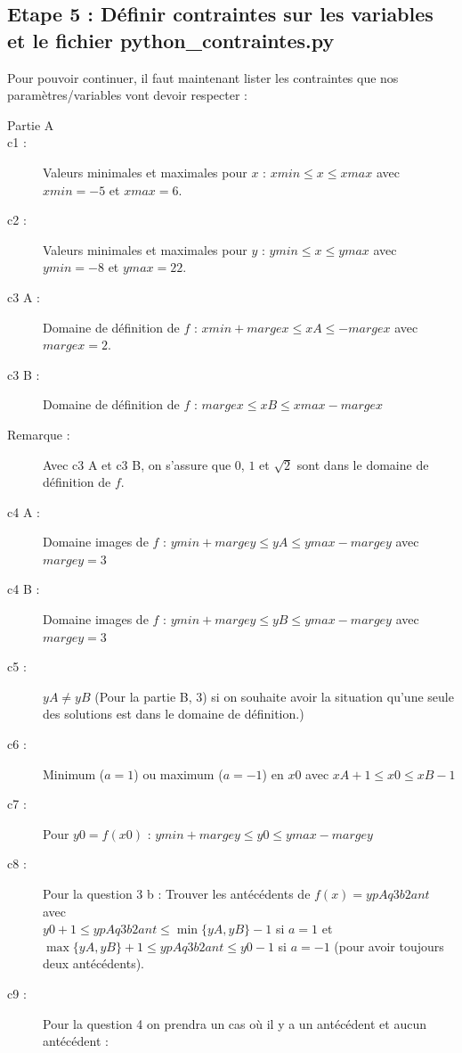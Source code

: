 {\begin{remarque}
\end{remarque}

\subsection{Etape 5 : Définir contraintes sur les variables et le fichier {\bf python\_contraintes.py}}
 Pour pouvoir continuer, il faut maintenant lister les contraintes que nos paramètres/variables vont devoir respecter : 

\begin{description}
\item[Partie A]
  \item[c1 : ] Valeurs minimales et maximales pour $x$ :  $xmin\leq x\leq xmax$ avec $xmin = -5$ et $xmax = 6$.
\item[c2 : ] Valeurs minimales et maximales pour $y$ :  $ymin\leq x\leq ymax$ avec $ymin = -8$ et $ymax = 22$.
\item[c3 A : ] Domaine de définition de $f$ : $xmin+margex\leq xA \leq -margex$ avec $margex = 2$. 
\item[c3 B : ] Domaine de définition de $f$ : $margex\leq xB \leq xmax-margex$ 
\item[Remarque : ] Avec c3 A et c3 B, on s'assure que $0$, $1$ et $\sqrt{2}$ sont dans le domaine de définition de $f$. 
\item[c4 A : ] Domaine images de $f$ : $ymin+margey\leq yA \leq ymax-margey$ avec $margey = 3$
\item[c4 B : ] Domaine images de $f$ : $ymin+margey\leq yB \leq ymax-margey$ avec $margey = 3$
\item[c5 : ] $yA \neq yB$ (Pour la partie B, 3) si on souhaite avoir la situation qu'une seule des solutions est dans le domaine de définition.)
\item[c6 : ] Minimum ($a=1$) ou maximum ($a=-1$) en $x0$ avec $xA +1\leq x0\leq xB-1$
\item[c7 : ] Pour $y0=f(x0)$ :  $ymin+margey\leq y0 \leq ymax-margey$
\item[c8 : ] Pour la question 3 b : Trouver les antécédents de $f(x) =  ypAq3b2ant $ avec \\
          $y0+1 \leq  ypAq3b2ant \leq \min\{yA,yB\}-1$ si $a=1$ et \\
          $  \max\{yA,yB\}+1\leq  ypAq3b2ant \leq y0-1$ si $a=-1$ (pour avoir toujours deux antécédents).
\item[c9 : ] Pour la question 4 on prendra un cas où il y a un antécédent et aucun antécédent : \\

\end{description}}
